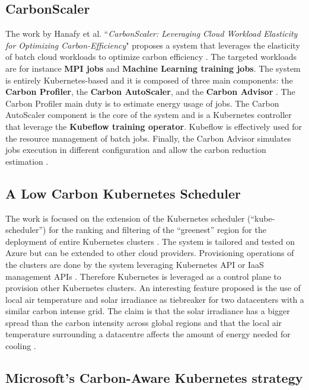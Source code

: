 \subsection{CarbonScaler}

The work by Hanafy et al. ``\textit{CarbonScaler: Leveraging Cloud Workload Elasticity for Optimizing Carbon-Efficiency}" proposes a system that leverages the elasticity of batch cloud workloads to optimize carbon efficiency \cite{10.1145/3626788}.
The targeted workloads are for instance \textbf{MPI jobs} and \textbf{Machine Learning training jobs}.
The system is entirely Kubernetes-based and it is composed of three main components: the \textbf{Carbon Profiler}, the \textbf{Carbon AutoScaler}, and the \textbf{Carbon Advisor} \cite{10.1145/3626788}.
The Carbon Profiler main duty is to estimate energy usage of jobs.
The Carbon AutoScaler component is the core of the system and is a Kubernetes controller that leverage the \textbf{Kubeflow training operator}.
Kubeflow is effectively used for the resource management of batch jobs.
Finally, the Carbon Advisor simulates jobs execution in different configuration and allow the carbon reduction estimation \cite{10.1145/3626788}.

\subsection{A Low Carbon Kubernetes Scheduler}
\label{sec:low_carbon_k8s_scheduler}

The work is focused on the extension of the Kubernetes scheduler (``kube-scheduler'') for the ranking and filtering of the ``greenest'' region for the deployment of entire Kubernetes clusters \cite{low_carbon_k8s_scheduler}.
The system is tailored and tested on Azure but can be extended to other cloud providers.
Provisioning  operations of the clusters are done by the system leveraging Kubernetes API or IaaS management APIs \cite{low_carbon_k8s_scheduler}.
Therefore Kubernetes is leveraged as a control plane to provision other Kubernetes clusters.
An interesting feature proposed is the use of local air temperature and solar irradiance as tiebreaker for two datacenters with a similar carbon intense grid. 
The claim is that the solar irradiance has a bigger spread than the carbon intensity across global regions and that the local air temperature surrounding a datacentre affects the amount of energy needed for cooling \cite{low_carbon_k8s_scheduler}. 

\subsection{Microsoft's Carbon-Aware Kubernetes strategy}
\label{sec:microsoft_carbon_aware_k8s}

